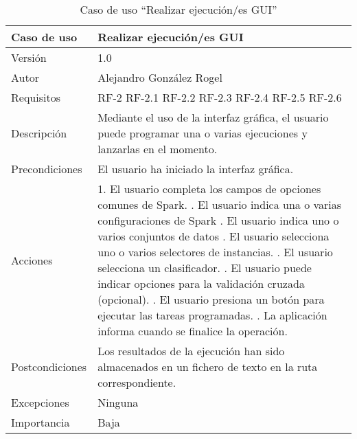  
\begin{table}
  \begin{center}
   \begin{tabular}{|>{} L{3cm} | L{9cm} |}
    \hline
    Caso de uso & Realizar ejecución/es GUI\\
    \hline
    Versión & 1.0 \\
    \hline
    Autor & Alejandro González Rogel \\
    \hline
    Requisitos & 
    		RF-2\newline
    		RF-2.1\newline
		RF-2.2\newline
		RF-2.3\newline
		RF-2.4\newline
		RF-2.5\newline
		RF-2.6\\
    \hline
    Descripción & Mediante el uso de la interfaz gráfica, el usuario puede programar una o varias ejecuciones y lanzarlas en el momento.\\
    \hline
    Precondiciones & El usuario ha iniciado la interfaz gráfica. \\
    \hline
    Acciones & 1. El usuario completa los campos de opciones comunes de Spark. . El usuario indica una o varias configuraciones de Spark . El usuario indica uno o varios conjuntos de datos . El usuario selecciona uno o varios selectores de instancias. . El usuario selecciona un clasificador. . El usuario puede indicar opciones para la validación cruzada (opcional). . El usuario presiona un botón para ejecutar las tareas programadas. . La aplicación informa cuando se finalice la operación.
    			   \\
    \hline
    Postcondiciones & Los resultados de la ejecución han sido almacenados en un fichero de texto en la ruta correspondiente. \\
    \hline
    Excepciones & Ninguna \\
    \hline
    Importancia & Baja \\
    \hline
   \end{tabular}
   \caption{Caso de uso ``Realizar ejecución/es GUI''}
   \label{tabla:casoUso2}
  \end{center}
 \end{table} 
 
